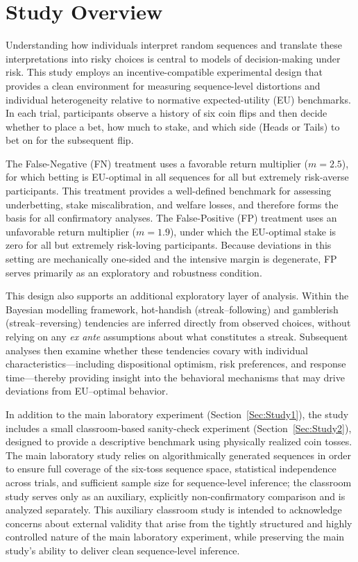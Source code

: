 \documentclass[11pt,a4paper]{article}
\numberwithin{equation}{section}
\begin{document}
\section{Study Overview}
\label{Sec:Study}

Understanding how individuals interpret random sequences and translate these interpretations into risky choices is central to models of decision-making under risk. 
This study employs an incentive-compatible experimental design that provides a clean environment for measuring sequence-level distortions and individual heterogeneity relative to normative expected-utility (EU) benchmarks. 
In each trial, participants observe a history of six coin flips and then decide whether to place a bet, how much to stake, and which side (Heads or Tails) to bet on for the subsequent flip.

The False-Negative (FN) treatment uses a favorable return multiplier 
($m=2.5$), for which betting is EU-optimal in all sequences for all but 
extremely risk-averse participants. This treatment provides a well-defined 
benchmark for assessing underbetting, stake miscalibration, and welfare 
losses, and therefore forms the basis for all confirmatory analyses.
The False-Positive (FP) treatment uses an unfavorable return multiplier 
($m=1.9$), under which the EU-optimal stake is zero for all but extremely 
risk-loving participants. Because deviations in this setting are mechanically 
one-sided and the intensive margin is degenerate, FP serves primarily as an 
exploratory and robustness condition.

This design also supports an additional exploratory layer of analysis. 
Within the Bayesian modelling framework, hot-handish (streak--following) and gamblerish (streak--reversing) tendencies are inferred directly from observed choices, without relying on any \emph{ex ante} assumptions about what constitutes a streak. 
Subsequent analyses then examine whether these tendencies covary with individual characteristics---including dispositional optimism, risk preferences, and response time---thereby providing insight into the behavioral mechanisms that may drive deviations from EU--optimal behavior.

In addition to the main laboratory experiment (Section~\ref{Sec:Study1}), the study includes a small classroom-based sanity-check experiment (Section~\ref{Sec:Study2}), designed to provide a descriptive benchmark using physically realized coin tosses. The main laboratory study relies on algorithmically generated sequences in order to ensure full coverage of the six-toss sequence space, statistical independence across trials, and sufficient sample size for sequence-level inference; the classroom study serves only as an auxiliary, explicitly non-confirmatory comparison and is analyzed separately. This auxiliary classroom study is intended to acknowledge concerns about external validity that arise from the tightly structured and highly controlled nature of the main laboratory experiment, while preserving the main study’s ability to deliver clean sequence-level inference.
\end{document}

